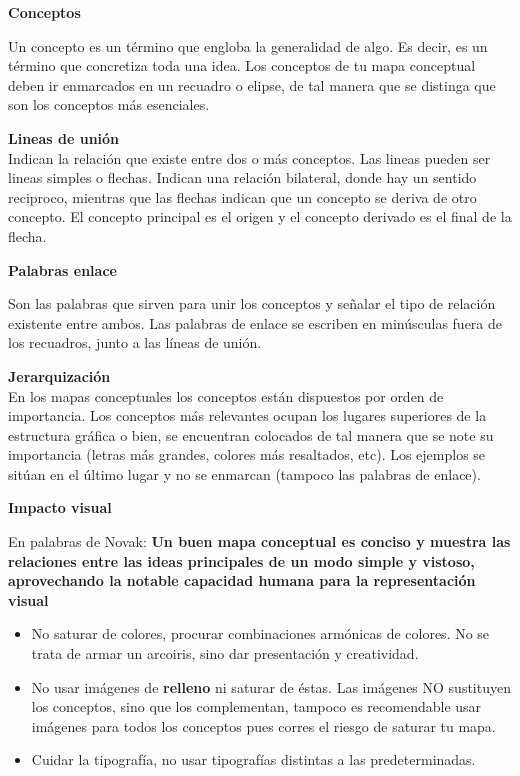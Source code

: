 \documentclass[
	11pt, %
]{beamer}
\begin{document}
\begin{frame}
  \textbf{Conceptos}
  \bigskip %

  Un concepto es un término que engloba la generalidad de algo. Es decir, es un término que concretiza toda una idea. Los conceptos de tu mapa conceptual deben ir enmarcados en un recuadro o elipse, de tal manera que se distinga que son los conceptos más esenciales.

  \bigskip %
  \textbf{Lineas de unión}\\
  \bigskip %
  Indican la relación que existe entre dos o más conceptos. Las lineas pueden ser lineas simples o flechas. Indican una relación bilateral, donde hay un sentido reciproco, mientras que las flechas indican que un concepto se deriva de otro concepto. El concepto principal es el origen y el concepto derivado es el final de la flecha.
  
\end{frame}

\begin{frame}
  \textbf{Palabras enlace}
  \bigskip %

  Son las palabras que sirven para unir los conceptos y señalar el tipo de relación existente entre ambos. Las palabras de enlace se escriben en minúsculas fuera de los recuadros, junto a las líneas de unión.

  \bigskip %
  \textbf{Jerarquización}\\
  \bigskip %
  En los mapas conceptuales los conceptos están dispuestos por orden de importancia. Los conceptos más relevantes ocupan los lugares superiores de la estructura gráfica o bien, se encuentran colocados de tal manera que se note su importancia (letras más grandes, colores más resaltados, etc). Los ejemplos se sitúan en el último lugar y no se enmarcan (tampoco las palabras de enlace).
  
\end{frame}

\begin{frame}
  \textbf{Impacto visual}
  \bigskip %

  En palabras de Novak: \textbf{Un buen mapa conceptual es conciso y muestra las relaciones entre las ideas principales de un modo simple y vistoso, aprovechando la notable capacidad humana para la representación visual}\\

  \begin{itemize}
  \item No saturar de colores, procurar combinaciones armónicas de colores. No se trata de armar un arcoiris, sino dar presentación y creatividad.
  \item No usar imágenes de \textbf{relleno} ni saturar de éstas. Las imágenes NO sustituyen los conceptos, sino que los complementan, tampoco es recomendable usar imágenes para todos los conceptos pues corres el riesgo de saturar tu mapa.
  \item Cuidar la tipografía, no usar tipografías distintas a las predeterminadas. 
  \end{itemize}
\end{frame}
\end{document}
